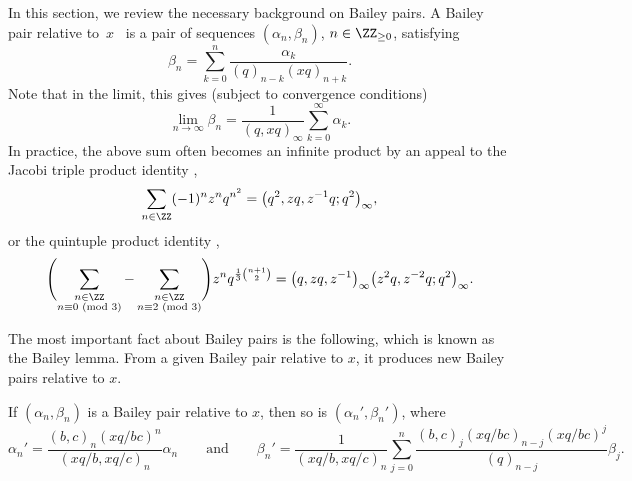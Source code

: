 In this section, we review the necessary background on Bailey pairs. A Bailey pair relative to~$x$~\cite{Andmultiple} is a pair of sequences $(\alpha_n,\beta_n)$,
$n\in \ZZ_{\geq 0}$,
satisfying
\begin{equation*} %
	\beta_n = \sum_{k=0}^n \frac{\alpha_k}{(q)_{n-k}(xq)_{n+k}}.
\end{equation*}
Note that in the limit, this gives (subject to convergence conditions)
\begin{equation} \label{Baileylimit}
	\lim_{n \to \infty} \beta_n = \frac{1}{(q,xq)_{\infty}} \sum_{k=0}^{\infty} \alpha_k.
\end{equation}
In practice, the above sum often becomes an infinite product by an appeal to the Jacobi triple product identity \cite[equation~(2.2.10)]{AndBook},
\begin{align}
	\sum_{n\in\ZZ}(-1)^n z^nq^{n^2}=\bigl(q^2,zq,z^{-1}q;q^2\bigr)_\infty,
	\label{eqn:jtp}
\end{align}
or the quintuple product identity \cite{C-quint},
\begin{align}
	\Biggl(\sum_{\substack{n\in\ZZ\\ n\equiv 0\,\,(\mathrm{mod}\,\,3)}}
	-\sum_{\substack{n\in\ZZ\\ n\equiv 2\,\,(\mathrm{mod}\,\,3)}}
	\Biggr) z^nq^{\frac{1}{3}\binom{n+1}{2}}=\bigl(q,zq,z^{-1}\bigr)_\infty\bigl(z^2q,z^{-2}q;q^2\bigr)_\infty
	\label{eqn:qtp}.
\end{align}

The most important fact about Bailey pairs is the following, which is known as the Bailey lemma. From a given Bailey pair relative to $x$, it produces new Bailey pairs relative to $x$.

\begin{Lemma} \label{Baileylemma}
	If $(\alpha_n,\beta_n)$ is a Bailey pair relative to $x$, then so is $(\alpha_n',\beta_n')$, where
	\begin{equation*} %
		\alpha_n' = \frac{(b,c)_n(xq/bc)^n}{(xq/b,xq/c)_n}\alpha_n
	\qquad
	\text{and}
	\qquad %
		\beta_n' = \frac{1}{(xq/b,xq/c)_n} \sum_{j=0}^n \frac{(b,c)_j(xq/bc)_{n-j} (xq/bc)^j}{(q)_{n-j}} \beta_j.
	\end{equation*}
\end{Lemma}

